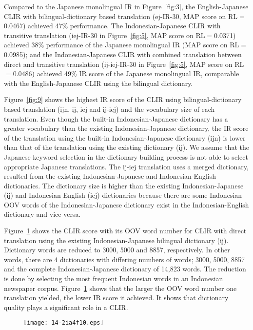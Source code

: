 \documentclass[english]{jnlp_1.3c}
\begin{document}
Compared to the Japanese monolingual IR in Figure~\ref{fig:3}, the
English-Japanese CLIR with bilingual-dictionary based translation
(ej-IR-30, MAP score on RL$=$0.0467) achieved 47\% performance. The
Indonesian-Japanese CLIR with transitive translation (iej-IR-30 in
Figure~\ref{fig:5}, MAP score on RL$=$0.0371) achieved 38\% performance
of the Japanese monolingual IR (MAP score on RL$=$0.0985); and the
Indonesian-Japanese CLIR with combined translation between direct and
transitive translation (ij-iej-IR-30 in Figure~\ref{fig:5}, MAP score on
RL$=$0.0486) achieved 49\% IR score of the Japanese monolingual IR,
comparable with the English-Japanese CLIR using the bilingual
dictionary.  

Figure~\ref{fig:9} shows the highest IR score of the CLIR
using bilingual-dictionary based translation (ijn, ij, iej and ij-iej)
and the vocabulary size of each translation. Even though the built-in
Indonesian-Japanese dictionary has a greater vocabulary than the
existing Indonesian-Japanese dictionary, the IR score of the translation
using the built-in Indonesian-Japanese dictionary (ijn) is lower than
that of the translation using the existing dictionary (ij). We assume
that the Japanese keyword selection in the dictionary building process
is not able to select appropriate Japanese translations. The ij-iej
translation uses a merged dictionary, resulted from the existing
Indonesian-Japanese and Indonesian-English dictionaries. The dictionary
size is higher than the existing Indonesian-Japanese (ij) and
Indonesian-English (iej) dictionaries because there are some Indonesian
OOV words of the Indonesian-Japanese dictionary exist in the
Indonesian-English dictionary and vice versa.

Figure~\ref{fig:10} shows the CLIR score with its OOV word number for
CLIR with direct translation using the existing Indonesian-Japanese
bilingual dictionary (ij). Dictionary words are reduced to 3000, 5000
and 8857, respectively. In other words, there are 4 dictionaries with
differing numbers of words; 3000, 5000, 8857 and the complete
Indonesian-Japanese dictionary of 14,823 words. The reduction is done by
selecting the most frequent Indonesian words in an Indonesian newspaper
corpus. Figure~\ref{fig:10} shows that the larger the OOV word number
one translation yielded, the lower IR score it achieved. It shows that
dictionary quality plays a significant role in a CLIR.

\begin{figure}[b]
\vspace{\baselineskip}
 \begin{center}
       \texttt{[image: 14-2ia4f10.eps]}
 \end{center}
 \label{fig:10}
\end{figure}
\end{document}
